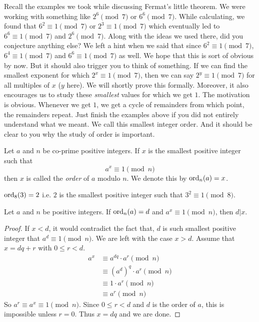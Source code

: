\documentclass{subfile}
\begin{document}
Recall the examples we took while discussing Fermat's little theorem. We were working with something like $2^6\pmod7$ or $6^6\pmod7$. While calculating, we found that $6^2\equiv1\pmod7$ or $2^3\equiv1\pmod7$ which eventually led to $6^6\equiv1\pmod7$ and $2^6\pmod7$. Along with the ideas we used there, did you conjecture anything else? We left a hint when we said that since $6^2\equiv1\pmod7$, $6^4\equiv1\pmod7$ and $6^6\equiv1\pmod7$ as well. We hope that this is sort of obvious by now. But it should also trigger you to think of something. If we can find the smallest exponent for which $2^x\equiv1\pmod7$, then we can say $2^y\equiv1\pmod7$ for all multiples of $x$ ($y$ here). We will shortly prove this formally. Moreover, it also encourages us to study these \textit{smallest }values for which we get $1$. The motivation is obvious. Whenever we get $1$, we get a cycle of remainders from which point, the remainders repeat. Just finish the examples above if you did not entirely understand what we meant. We call this smallest integer order. And it should be clear to you why the study of order is important.
	\begin{definition}
		Let $a$ and $n$ be co-prime positive integers. If $x$ is the smallest positive integer such that  \[a^x\equiv1\pmod n\] then $x$ is called the \textit{order} of $a$ modulo $n$. We denote this by $\operatorname{ord}_n(a)=x$.
	\end{definition}

	\begin{example}
		$\operatorname{ord}_8(3)=2$ i.e. $2$ is the smallest positive integer such that  $3^2\equiv1\pmod 8$.
	\end{example}


	\begin{theorem}\label{thm:ordDiv}
		Let $a$ and $n$ be positive integers. If $\operatorname{ord}_n(a)=d$ and $a^x\equiv1\pmod n$, then $d|x$.
	\end{theorem}

	\begin{proof}
		If $x<d$, it would contradict the fact that, $d$ is such smallest positive integer that $a^d\equiv1\pmod n$. We are left with the case $x>d$. Assume that $x=dq+r$ with $0\leq r<d$.
			\begin{align*}
				a^x
					& \equiv a^{dq}\cdot a^r\pmod{n}\\
					& \equiv (a^d)^q \cdot a^r\pmod{n}\\
					& \equiv 1 \cdot a^r\pmod{n}\\
					& \equiv a^r \pmod n
			\end{align*}
		So $a^r \equiv a^x \equiv 1 \pmod n$. Since $0\leq r<d$ and $d$ is the order of $a$, this is impossible unless $r=0$. Thus $x=dq$ and we are done.
	\end{proof}
\end{document}
